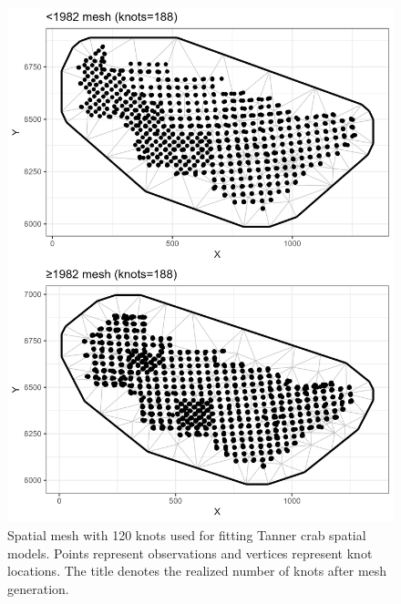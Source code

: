 \documentclass[
]{article}
\begin{document}
\begin{figure}

{\centering \includegraphics[width=6in]{../BAIRDI/Figures/mesh120} 

}

\caption{Spatial mesh with 120 knots used for fitting Tanner crab spatial models. Points represent observations and vertices represent knot locations. The title denotes the realized number of knots after mesh generation. }\label{fig:bairdi-120-mesh}
\end{figure}
\end{document}
